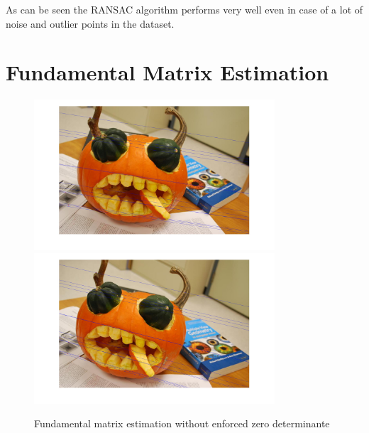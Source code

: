\documentclass[12pt]{article}
\begin{document}
As can be seen the RANSAC algorithm performs very well even in case of a lot of noise and outlier points in the dataset. 

\section{Fundamental Matrix Estimation}

\vspace{5mm}
\newline
\begin{figure}[ht]
	\centering
	\includegraphics[width=0.8\textwidth]{F1Pumkin.jpg}
	\includegraphics[width=0.8\textwidth]{F2Pumkin.jpg}
	\caption{Fundamental matrix estimation without enforced zero determinante}
	\label{fig1}
\end{figure}
\vspace{5mm}
\newline
\end{document}
